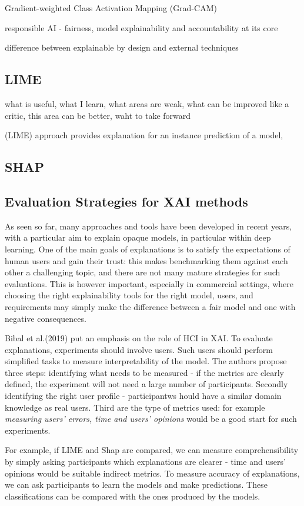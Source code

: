 \documentclass[proposal]{softeng}
\begin{document}
Gradient-weighted Class Activation Mapping (Grad-CAM)

responsible AI - fairness, model explainability and accountability at its core

difference between explainable by design and external techniques
\subsection{LIME}
what is useful, what I learn, what areas are weak, what can be improved 
like a critic, this area can be better, waht to take forward

(LIME) approach provides explanation for an instance prediction of a model,
\subsection{SHAP}
\subsection{Evaluation Strategies for XAI methods}
As seen so far, many approaches and tools have been developed in recent years, with a particular aim to explain opaque models, in particular within deep learning. One of the main goals of explanations is to satisfy the expectations of human users and gain their trust:  this makes benchmarking them against each other a challenging topic, and there are not many mature strategies for such evaluations. This is however important, especially in commercial settings, where choosing the right explainability tools for the right model, users, and requirements may simply make the difference between a fair model and one with negative consequences.


Bibal et al.(2019) \cite{bibal2019user} put an emphasis on the role of HCI in XAI. To evaluate explanations, experiments should involve users. Such users should perform simplified tasks to measure interpretability of the model. The authors propose three steps: identifying what needs to be measured - if the metrics are clearly defined, the experiment will not need a large number of participants. Secondly identifying the right user profile - participantws hould have a similar domain knowledge as real users. Third are the type of metrics used: for example \textit{measuring users’ errors, time and users’ opinions} would be a good start for such experiments. 

For example, if LIME and Shap are compared, we can measure comprehensibility by simply asking participants which explanations are clearer - time and users' opinions would be suitable indirect metrics. To measure accuracy of explanations, we can ask participants to learn the models and make predictions. These classifications can be compared with the ones produced by the models.
\end{document}

